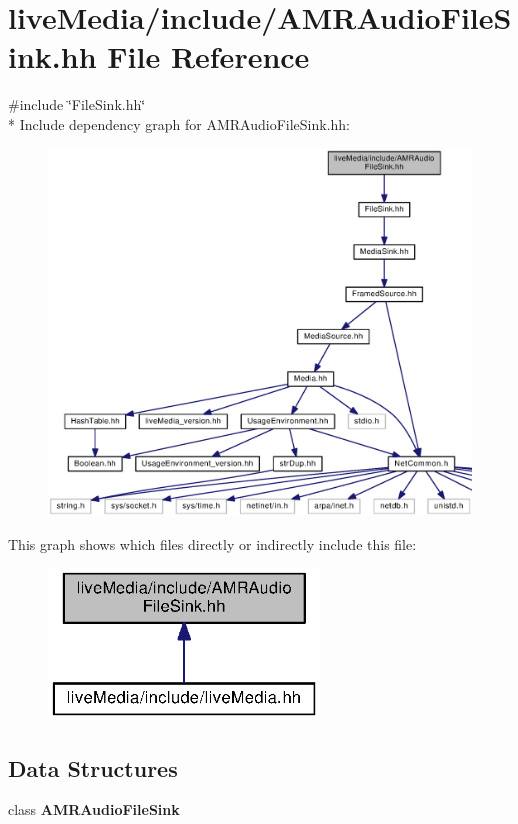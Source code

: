 \section{live\+Media/include/\+A\+M\+R\+Audio\+File\+Sink.hh File Reference}
\label{AMRAudioFileSink_8hh}
{\ttfamily \#include \char`\"{}File\+Sink.\+hh\char`\"{}}\\*
Include dependency graph for A\+M\+R\+Audio\+File\+Sink.\+hh\+:
\nopagebreak
\begin{figure}[H]
\begin{center}
\leavevmode
\includegraphics[width=350pt]{AMRAudioFileSink_8hh__incl}
\end{center}
\end{figure}
This graph shows which files directly or indirectly include this file\+:
\nopagebreak
\begin{figure}[H]
\begin{center}
\leavevmode
\includegraphics[width=204pt]{AMRAudioFileSink_8hh__dep__incl}
\end{center}
\end{figure}
\subsection*{Data Structures}
\begin{DoxyCompactItemize}
\item 
class {\bf A\+M\+R\+Audio\+File\+Sink}
\end{DoxyCompactItemize}
